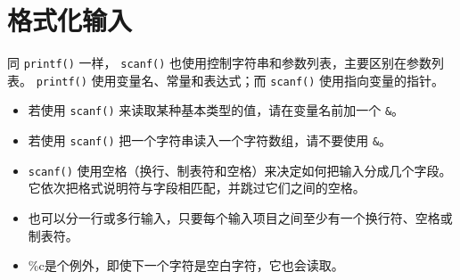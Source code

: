 \section{格式化输入}
\begin{frame}[fragile]\ft{\secname}
  同 \lstinline|printf()| 一样， \lstinline|scanf()| 也使用控制字符串和参数列表，主要区别在参数列表。 \lstinline|printf()| 使用变量名、常量和表达式；而 \lstinline|scanf()| 使用指向变量的指针。
\end{frame}

\begin{frame}[fragile]
\begin{itemize}
\item 
  若使用 \lstinline|scanf()| 来读取某种基本类型的值，请在变量名前加一个 \lstinline|&|。 \\[0.1in]
\item
  若使用 \lstinline|scanf()| 把一个字符串读入一个字符数组，请不要使用 \lstinline|&|。
\end{itemize}
\end{frame}

% 


\begin{frame}[fragile]
\begin{itemize}
\item
  \lstinline|scanf()| 使用空格（换行、制表符和空格）来决定如何把输入分成几个字段。
它依次把格式说明符与字段相匹配，并跳过它们之间的空格。\\[0.1in]
\item
也可以分一行或多行输入，只要每个输入项目之间至少有一个换行符、空格或制表符。\\[0.1in]
\item
\%c是个例外，即使下一个字符是空白字符，它也会读取。
\end{itemize}
\end{frame}

